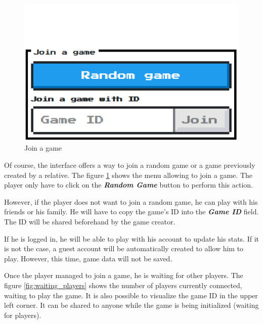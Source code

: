 \documentclass{tnreport}
\begin{document}
\begin{figure}
	\centering
	\includegraphics[scale=0.7]{figures/join_game}
	\caption{Join a game}
	\label{fig:join_game}
\end{figure}

Of course, the interface offers a way to join a random game or a game previously created by a relative. The figure \ref{fig:join_game} shows the menu allowing to join a game. The player only have to click on the \textit{\textbf{Random Game}} button to perform this action. 

However, if the player does not want to join a random game, he can play with his friends or his family. He will have to copy the game's ID into the \textbf{\textit{Game ID}} field. The ID will be shared beforehand by the game creator. 

If he is logged in, he will be able to play with his account to update his stats. If it is not the case, a guest account will be automatically created to allow him to play. However, this time, game data will not be saved. 

Once the player managed to join a game, he is waiting for other players. The figure \ref{fig:waiting_players} shows the number of players currently connected, waiting to play the game. It is also possible to visualize the game ID in the upper left corner. It can be shared to anyone while the game is being initialized (waiting for players). 
\end{document}
